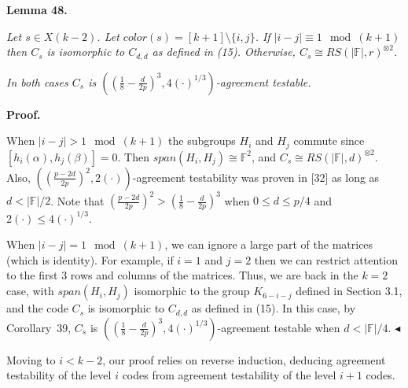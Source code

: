 

\par\medskip\noindent\textbf{
\textbf{Lemma 48}\textbf{.}
}\par



\emph{Let $s\in X(k-2)$. Let $color(s)=[k+1]\setminus\{i,j\}$. If $|i-j|\equiv 1\mod(k+1)$ then $C_{s}$ is isomorphic to $C_{d,d}$ as defined in (15).
Otherwise, $C_{s}\cong RS(\lvert\mathbb{F}\rvert,r)^{\otimes 2}$.}\par




\emph{In both cases $C_{s}$ is $\left(\left(\frac{1}{8}-\frac{d}{2p}\right)^{3},4(\cdot)^{1/3}\right)$-agreement testable.}\par






\par\medskip\noindent\textbf{Proof.}\par




When $\lvert i-j\rvert>1\mod(k+1)$ the subgroups $H_{i}$ and $H_{j}$ commute since $[h_{i}(\alpha),h_{j}(\beta)]=0$. Then $span(H_{i},H_{j})\cong\mathbb{F}^{2}$, and $C_{s}\cong RS(\lvert\mathbb{F}\rvert,d)^{\otimes 2}$. Also, $\left(\left(\frac{p-2d}{2p}\right)^{2},2(\cdot)\right)$-agreement testability was proven in [32] as long as $d<\lvert\mathbb{F}\rvert/2$. Note that $\left(\frac{p-2d}{2p}\right)^{2}>\left(\frac{1}{8}-\frac{d}{2p}\right)^{3}$ when $0\leq d\leq p/4$ and $2(\cdot)\leq 4(\cdot)^{1/3}$.\par




When $\lvert i-j\rvert=1\mod(k+1)$, we can ignore a large part of the matrices (which is identity). For example, if $i=1$ and $j=2$ then we can restrict attention to the first $3$ rows and columns of the matrices. Thus, we are back in the $k=2$ case, with $span(H_{i},H_{j})$ isomorphic to the group $K_{6-i-j}$ defined in Section 3.1, and the code $C_{s}$ is isomorphic to $C_{d,d}$ as defined in (15). In this case, by Corollary 39, $C_{s}$ is $\left(\left(\frac{1}{8}-\frac{d}{2p}\right)^{3},4(\cdot)^{1/3}\right)$-agreement testable when $d<|\mathbb{F}|/4$.
$\blacktriangleleft$\par




Moving to $i<k-2$, our proof relies on reverse induction, deducing agreement testability of the level $i$ codes from agreement testability of the level $i+1$ codes.\par



